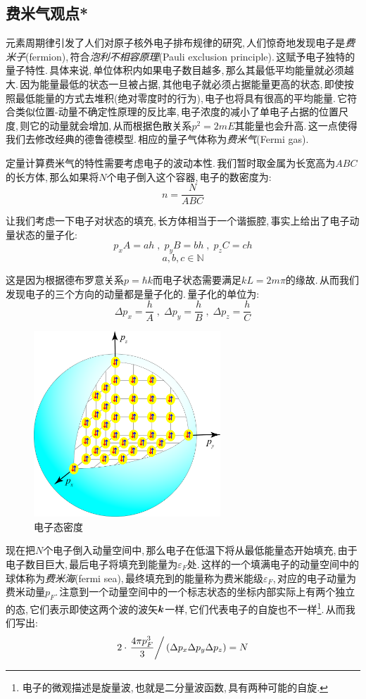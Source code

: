 \subsection{费米气观点*}

元素周期律引发了人们对原子核外电子排布规律的研究,\,人们惊奇地发现电子是\emph{费米子}(fermion),\,符合\emph{泡利不相容原理}(Pauli exclusion principle).\,这赋予电子独特的量子特性.\,具体来说,\,单位体积内如果电子数目越多,\,那么其最低平均能量就必须越大.\,因为能量最低的状态一旦被占据,\,其他电子就必须占据能量更高的状态,\,即使按照最低能量的方式去堆积(绝对零度时的行为),\,电子也将具有很高的平均能量.\,它符合类似位置-动量不确定性原理的反比率,\,电子浓度的减小了单电子占据的位置尺度,\,则它的动量就会增加,\,从而根据色散关系$p^2=2mE$其能量也会升高.\,这一点使得我们去修改经典的德鲁德模型.\,相应的量子气体称为\emph{费米气}(Fermi gas).

定量计算费米气的特性需要考虑电子的波动本性.\,我们暂时取金属为长宽高为$ABC$的长方体,\,那么如果将$N$个电子倒入这个容器,\,电子的数密度为:
\[n=\frac{N}{ABC}\]

让我们考虑一下电子对状态的填充,\,长方体相当于一个谐振腔,\,事实上给出了电子动量状态的量子化:
\[p_x A=ah\;,\; p_y B=bh\;,\; p_z C=ch\]
\[a,b,c\in\mathbb{N}\]

这是因为根据德布罗意关系$p=\hbar k$而电子状态需要满足$kL=2m\pi$的缘故.\,从而我们发现电子的三个方向的动量都是量子化的.\,量子化的单位为:
\[\Delta p_x=\frac{h}{A}\;,\;\Delta p_y=\frac{h}{B}\;,\;\Delta p_z=\frac{h}{C}\]

\begin{figure}
\centering
\includegraphics[width=7cm]{image/7-3-1.png}
\caption{电子态密度}
\end{figure}
现在把$N$个电子倒入动量空间中,\,那么电子在低温下将从最低能量态开始填充,\,由于电子数目巨大,\,最后电子将填充到能量为$\varepsilon_F$处.\,这样的一个填满电子的动量空间中的球体称为\emph{费米海}(fermi sea),\,最终填充到的能量称为费米能级$\varepsilon_F$,\,对应的电子动量为费米动量$p_F$.\,注意到一个动量空间中的一个标志状态的坐标内部实际上有两个独立的态,\,它们表示即使这两个波的波矢$\boldsymbol{k}$一样,\,它们代表电子的自旋也不一样\footnote{电子的微观描述是旋量波,\,也就是二分量波函数,\,具有两种可能的自旋.}.\,从而我们写出:
\[2\cdot\left.\frac{4\pi p_F^3}{3}\right/(\Delta p_x \Delta p_y \Delta p_z)=N\]

